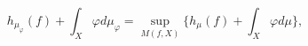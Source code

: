 \documentclass{article}
\begin{document}
\[h_{\mu_\varphi}(f)+\int_X \varphi d \mu_\varphi = \sup_{M(f,X)}  \{h_\mu (f) + \int_X \varphi d \mu \}, \]
\end{document}
